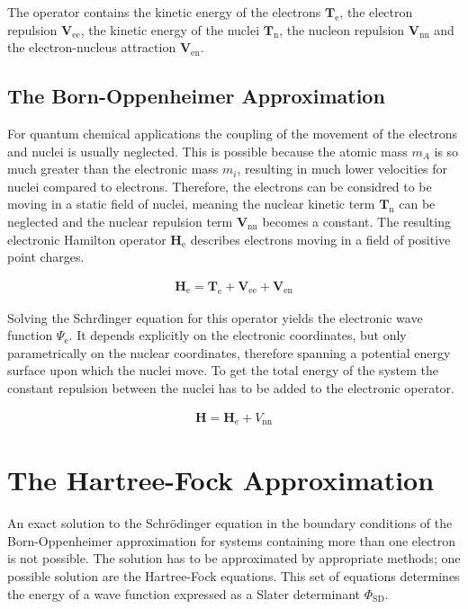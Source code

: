 The operator contains the kinetic energy of the electrons
$\mathbf{T}_\text{e}$, the electron repulsion $\mathbf{V}_\text{ee}$, the
kinetic energy of the nuclei $\mathbf{T}_\text{n}$, the nucleon repulsion
$\mathbf{V}_\text{nn}$ and the electron-nucleus attraction
$\mathbf{V}_\text{en}$.

\subsection{The Born-Oppenheimer Approximation}
\label{sec:bornoppenheimerapproximation}

For quantum chemical applications the coupling of the movement of the electrons
and nuclei is usually neglected. This is possible because the atomic mass $m_A$
is so much greater than the electronic mass $m_i$, resulting in much lower
velocities for nuclei compared to electrons. Therefore, the electrons can be
considred to be moving in a static field of nuclei, meaning the nuclear kinetic
term $\mathbf{T}_\text{n}$ can be neglected and the nuclear repulsion term
$\mathbf{V}_\text{nn}$ becomes a constant. The resulting electronic Hamilton
operator $\mathbf{H}_\text{e}$ describes electrons moving in a field of
positive point charges.

\begin{align}
    \mathbf{H}_\text{e}=\mathbf{T}_\text{e} + \mathbf{V}_\text{ee} + \mathbf{V}_\text{en}
\end{align}

Solving the Schr\"dinger equation for this operator yields the electronic wave
function $\Psi_\text{e}$. It depends explicitly on the electronic coordinates,
but only parametrically on the nuclear coordinates, therefore spanning a
potential energy surface upon which the nuclei move. To get the total energy of
the system the constant repulsion between the nuclei has to be added to the
electronic operator.

\begin{align}
    \mathbf{H}=\mathbf{H}_\text{e}+V_\text{nn}\label{eqn:hamiltonoperatorfinal}
\end{align}

\section{The Hartree-Fock Approximation}
\label{sec:hartreefockapproximation}

An exact solution to the Schr\"odinger equation in the boundary conditions of
the Born-Oppenheimer approximation for systems containing more than one
electron is not possible. The solution has to be approximated by appropriate
methods; one possible solution are the Hartree-Fock equations. This set of
equations determines the energy of a wave function expressed as a Slater
determinant $\Phi_\text{SD}$.

